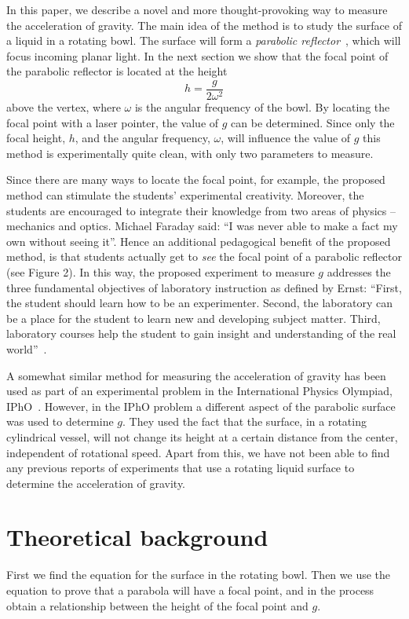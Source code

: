 \documentclass[12pt, a4paper, twocolumn]{article}
\begin{document}
In this paper, we describe a novel and more thought-provoking way to measure the acceleration of gravity. The main idea of the method is to study the surface of a liquid in a rotating bowl. The surface will form a \emph{parabolic reflector}~\cite{Berg1990}, which will focus incoming planar light. In the next section we show that the focal point of the parabolic reflector is located at the height
\begin{equation}
h=\frac{g}{2\omega^2}
\end{equation}
above the vertex, where $\omega$ is the angular frequency of the bowl. By locating the focal point with a laser pointer, the value of $g$ can be determined. Since only the focal height, $h$, and the angular frequency, $\omega$, will influence the value of $g$ this method is experimentally quite clean, with only two parameters to measure. 

Since there are many ways to locate the focal point, for example, the proposed method can stimulate the students' experimental creativity. Moreover, the students are encouraged to integrate their knowledge from two areas of physics -- mechanics and optics. Michael Faraday said: 
``I was never able to make a fact my own without seeing it''.
Hence an additional pedagogical benefit of the proposed method, is that students actually get to \emph{see} the focal point of a parabolic reflector (see Figure 2). In this way, the proposed experiment to measure $g$ addresses the three fundamental objectives of laboratory instruction as defined by Ernst:
``First, the student should learn how to be an experimenter. Second, the laboratory can be a place for the student to learn new and developing subject matter. Third, laboratory courses help the student to gain insight and understanding of the real world''~\cite{Ernst1983}.

A somewhat similar method for measuring the acceleration of gravity has been used as part of an experimental problem in the International Physics Olympiad, IPhO~\cite{IPhO2001}. However, in the IPhO problem a different aspect of the parabolic surface was used to determine $g$. They used the fact that the surface, in a rotating cylindrical vessel, will not change its height at a certain distance from the center, independent of rotational speed. Apart from this, we have not been able to find any previous reports of experiments that use a rotating liquid surface to determine the acceleration of gravity.

\section{Theoretical background}
First we find the equation for the surface in the rotating bowl. Then we use the equation to prove that a parabola will have a focal point, and in the process obtain a relationship between the height of the focal point and $g$.
\end{document}
